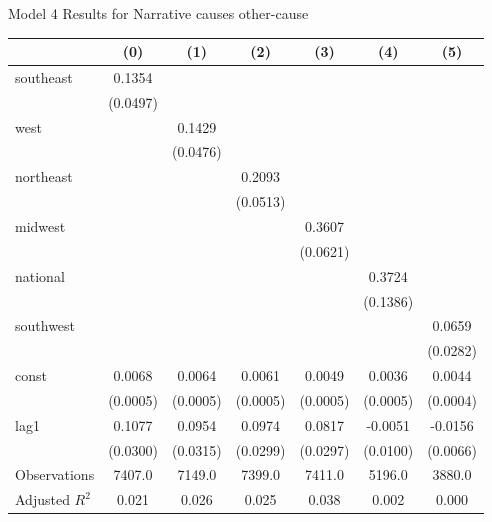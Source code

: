 \caption{Model 4 Results for Narrative causes other-cause}
\begin{tabular}{lcccccc}
\toprule
 & (0) & (1) & (2) & (3) & (4) & (5) \\
\midrule
southeast & 0.1354 &  &  &  &  &  \\
\vspace{0.2cm}
 & (0.0497) &  &  &  &  &  \\
west &  & 0.1429 &  &  &  &  \\
\vspace{0.2cm}
 &  & (0.0476) &  &  &  &  \\
northeast &  &  & 0.2093 &  &  &  \\
\vspace{0.2cm}
 &  &  & (0.0513) &  &  &  \\
midwest &  &  &  & 0.3607 &  &  \\
\vspace{0.2cm}
 &  &  &  & (0.0621) &  &  \\
national &  &  &  &  & 0.3724 &  \\
\vspace{0.2cm}
 &  &  &  &  & (0.1386) &  \\
southwest &  &  &  &  &  & 0.0659 \\
\vspace{0.2cm}
 &  &  &  &  &  & (0.0282) \\
const & 0.0068 & 0.0064 & 0.0061 & 0.0049 & 0.0036 & 0.0044 \\
\vspace{0.2cm}
 & (0.0005) & (0.0005) & (0.0005) & (0.0005) & (0.0005) & (0.0004) \\
lag1 & 0.1077 & 0.0954 & 0.0974 & 0.0817 & -0.0051 & -0.0156 \\
\vspace{0.2cm}
 & (0.0300) & (0.0315) & (0.0299) & (0.0297) & (0.0100) & (0.0066) \\
\midrule
Observations & 7407.0 & 7149.0 & 7399.0 & 7411.0 & 5196.0 & 3880.0 \\
Adjusted $R^2$ & 0.021 & 0.026 & 0.025 & 0.038 & 0.002 & 0.000 \\
\bottomrule
\end{tabular}
